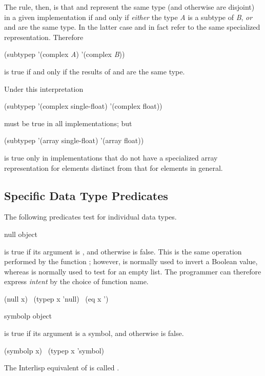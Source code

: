 \begin{defun}[Function]
\begin{new}
The rule, then, is that 
and  represent the same type (and otherwise are disjoint)
in a given implementation
if and only if {\it either} the type {\it A} is a subtype of {\it B}, {\it or}
 and
 are the same type.
In the latter case 
and  in fact refer to the same specialized representation.
Therefore
\begin{lisp}
(subtypep '(complex {\it A}) '(complex {\it B}))
\end{lisp}
is true if and only if the results of
 and
 are the same type.

Under this interpretation
\begin{lisp}
(subtypep '(complex single-float) '(complex float))
\end{lisp}
must be true in all implementations; but
\begin{lisp}
(subtypep '(array single-float) '(array float))
\end{lisp}
is true only in implementations that do not have a specialized array representation
for  elements distinct from that for  elements in
general.
\end{new}
\end{defun}

\subsection{Specific Data Type Predicates}

The following predicates test for individual data types.

\begin{defun}[Function]
null object

 is true if its argument is {\emptylist},
and otherwise is false.
This is the same operation performed by the function ;
however,  is normally used to invert a Boolean value,
whereas  is normally used to test for an empty list.  The programmer
can therefore express {\it intent} by the choice of function name.
\begin{lisp}
(null x) \EQ\ (typep x 'null) \EQ\ (eq x '{\emptylist})
\end{lisp}
\end{defun}

\begin{defun}[Function]
symbolp object

 is true if its argument is a symbol,
and otherwise is false.
\begin{lisp}
(symbolp x) \EQ\ (typep x 'symbol)
\end{lisp}

\beforenoterule
\begin{incompatibility}
The Interlisp equivalent of  is
called .
\end{incompatibility}
\afternoterule
\end{defun}

